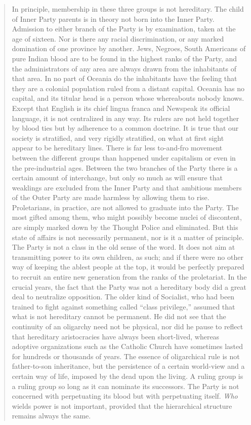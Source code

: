\begin{quotation}
In principle, membership in these three groups is not hereditary. The
child of Inner Party parents is in theory not born into the Inner Party.
Admission to either branch of the Party is by examination, taken at the
age of sixteen. Nor is there any racial discrimination, or any marked
domination of one province by another. Jews, Negroes, South Americans of
pure Indian blood are to be found in the highest ranks of the Party, and
the administrators of any area are always drawn from the inhabitants of
that area. In no part of Oceania do the inhabitants have the feeling
that they are a colonial population ruled from a distant capital.
Oceania has no capital, and its titular head is a person whose
whereabouts nobody knows. Except that English is its chief lingua franca
and Newspeak its official language, it is not centralized in any way.
Its rulers are not held together by blood ties but by adherence to a
common doctrine. It is true that our society is stratified, and very
rigidly stratified, on what at first sight appear to be hereditary
lines. There is far less to-and-fro movement between the different
groups than happened under capitalism or even in the pre-industrial
ages. Between the two branches of the Party there is a certain amount of
interchange, but only so much as will ensure that weaklings are excluded
from the Inner Party and that ambitious members of the Outer Party are
made harmless by allowing them to rise. Proletarians, in practice, are
not allowed to graduate into the Party. The most gifted among them, who
might possibly become nuclei of discontent, are simply marked down by
the Thought Police and eliminated. But this state of affairs is not
necessarily permanent, nor is it a matter of principle. The Party is not
a class in the old sense of the word. It does not aim at transmitting
power to its own children, as such; and if there were no other way of
keeping the ablest people at the top, it would be perfectly prepared to
recruit an entire new generation from the ranks of the proletariat. In
the crucial years, the fact that the Party was not a hereditary body did
a great deal to neutralize opposition. The older kind of Socialist, who
had been trained to fight against something called ``class privilege,''
assumed that what is not hereditary cannot be permanent. He did not see
that the continuity of an oligarchy need not be physical, nor did he
pause to reflect that hereditary aristocracies have always been
short-lived, whereas adoptive organizations such as the Catholic Church
have sometimes lasted for hundreds or thousands of years. The essence of
oligarchical rule is not father-to-son inheritance, but the persistence
of a certain world-view and a certain way of life, imposed by the dead
upon the living. A ruling group is a ruling group so long as it can
nominate its successors. The Party is not concerned with perpetuating
its blood but with perpetuating itself. \emph{Who} wields power is not
important, provided that the hierarchical structure remains always the
same.


\end{quotation}
